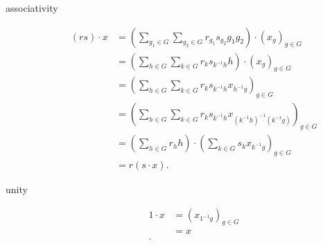 \documentclass[titlepage, a4paper]{article}
\theoremstyle{remark}
\begin{document}
\begin{description}
            \item[associativity]
                 \begin{align*}
                     (rs)\cdot x &= \left( \sum_{g_1 \in G} \sum_{g_2 \in G} r_{g_1} s_{g_2} g_1 g_2 \right) \cdot (x_{g})_{g \in G} \\
                             &= \left( \sum_{h \in G} \sum_{k \in G} r_{k}s_{k^{-1}h} h\right) \cdot  \left( x_{g} \right)_{g \in G} \\
                             &= \left( \sum_{h \in G} \sum_{k \in G} r_k s_{k^{-1}h} x_{h^{-1}g} \right)_{g \in G}  \\
                             &= \left( \sum_{h \in G} \sum_{k \in G} r_k s_{k^{-1}h} x_{(k^{-1} h)^{-1}(k^{-1}g)} \right)_{g \in G}  \\
                             &= \left(\sum_{h \in G} r_h h\right) \cdot  \left( \sum_{k \in G} s_{k} x_{k^{-1}g} \right)_{g \in G} \\
                             &= r(s\cdot x) 
                .\end{align*}
            \item[unity]
                \begin{align*}
                    1\cdot x &= (x_{1^{-1} g})_{g \in G} \\
                         &= x\\
                .\end{align*}
        \end{description}

	\pagebreak
	\printbibliography
\end{document}
